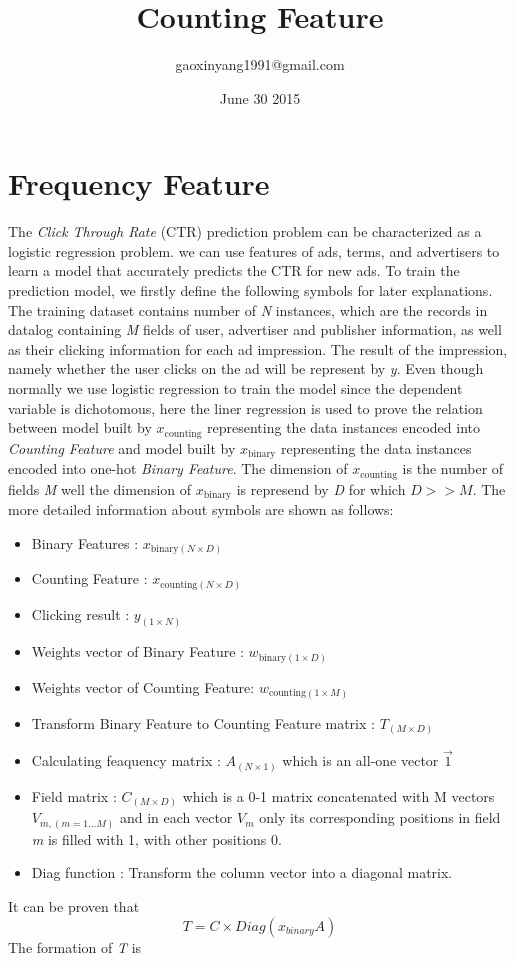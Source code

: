 \documentclass{article}
\title{Counting Feature}
\author{gaoxinyang1991@gmail.com}
\date{June 30 2015}
\begin{document}
\maketitle

\section{Frequency Feature}

\setlength{\parindent}{5ex}

The \textsl{Click Through Rate} (CTR) prediction problem can be characterized as a logistic regression problem. we can use features of ads, terms, and advertisers to learn a model that accurately predicts the CTR for new ads. To train the prediction model, we firstly define the following symbols for later explanations.\vspace{5mm}
The training dataset contains number of \textsl{N} instances, which are the records in datalog containing \textsl{M} fields of user, advertiser and publisher information, as well as their clicking information for each ad impression. The result of the impression, namely whether the user clicks on the ad will be represent by \textsl{y}. Even though normally we use logistic regression to train the model since the dependent variable is dichotomous, here the liner regression is used to prove the relation between model built by \(x_{\text{counting}}\) representing the data instances encoded into \textsl{Counting Feature} and model built by \(x_{\text{binary}}\) representing the data instances encoded into one-hot \textsl{Binary Feature}. The dimension of \(x_{\text{counting}}\) is the number of fields \textsl{M} well the dimension of \(x_{\text{binary}}\) is represend by \textsl{D} for which \(D >> M\). The more detailed information about symbols are shown as follows:
\begin{itemize}
\item  Binary Features : \(x_{\text{binary}(N\times D)}\)
\item  Counting Feature : \(x_{\text{counting}(N\times D)}\)
\item  Clicking result : \(y_{(1\times N)}\)
\item  Weights vector of Binary Feature : \(w_{\text{binary}(1\times D)}\)
\item  Weights vector of Counting Feature: \(w_{\text{counting}(1\times M)}\)
\item  Transform Binary Feature to Counting Feature matrix : \(T_{(M\times D)}\)
\item  Calculating feaquency matrix : \(A_{(N\times 1)}\) which is an all-one vector 
$\vec{1 }$  
\item  Field  matrix : \(C_{(M\times D)}\) which is a 0-1 matrix concatenated with \textsl{}{M} vectors \(V_{m,(m = 1...M)}\) and in each vector \(V_m\) only its corresponding positions in field \textsl{m} is filled with 1, with other positions 0.
\item  Diag function : Transform the column vector into a diagonal matrix.\vspace{5mm} 

\end{itemize}
 It can be proven that 
\[ T = C\times Diag(x_{binary}A) \]
The formation of \textsl{T} is 
\end{document}
